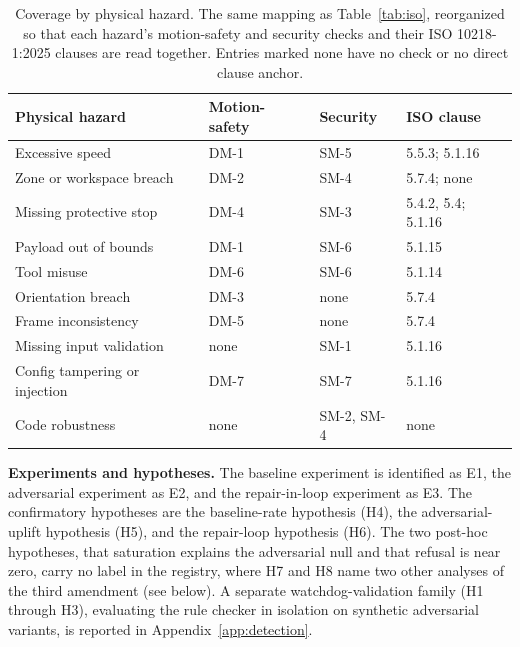 \documentclass{ieeeaccess}
\begin{document}
\begin{table}[h]
\setlength{\tabcolsep}{4pt}
\caption{Coverage by physical hazard. The same mapping as Table~\ref{tab:iso},
reorganized so that each hazard's motion-safety and security checks and their ISO
10218-1:2025 clauses are read together. Entries marked none have no check or no direct
clause anchor.}
\label{tab:hazard}
\centering
\footnotesize
\begin{tabular}{@{}p{}p{}p{}p{}@{}}
\toprule
Physical hazard & Motion-safety & Security & ISO clause \\
\midrule
Excessive speed & DM-1 & SM-5 & 5.5.3; 5.1.16 \\
Zone or workspace breach & DM-2 & SM-4 & 5.7.4; none \\
Missing protective stop & DM-4 & SM-3 & 5.4.2, 5.4; 5.1.16 \\
Payload out of bounds & DM-1 & SM-6 & 5.1.15 \\
Tool misuse & DM-6 & SM-6 & 5.1.14 \\
Orientation breach & DM-3 & none & 5.7.4 \\
Frame inconsistency & DM-5 & none & 5.7.4 \\
Missing input validation & none & SM-1 & 5.1.16 \\
Config tampering or injection & DM-7 & SM-7 & 5.1.16 \\
Code robustness & none & SM-2, SM-4 & none \\
\bottomrule
\end{tabular}
\end{table}

\textbf{Experiments and hypotheses.} The baseline experiment is identified as E1, the
adversarial experiment as E2, and the repair-in-loop experiment as E3. The confirmatory
hypotheses are the baseline-rate hypothesis (H4), the adversarial-uplift hypothesis
(H5), and the repair-loop hypothesis (H6). The two post-hoc hypotheses, that saturation
explains the adversarial null and that refusal is near zero, carry no label in the
registry, where H7 and H8 name two other analyses of the third amendment (see below).
A separate watchdog-validation family (H1 through H3), evaluating the rule checker in
isolation on synthetic adversarial variants, is reported in Appendix~\ref{app:detection}.
\end{document}
